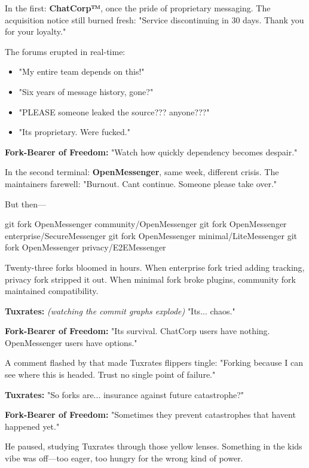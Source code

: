 In the first: \textbf{ChatCorp™}, once the pride of proprietary messaging. The acquisition notice still burned fresh: "Service discontinuing in 30 days. Thank you for your loyalty."

The forums erupted in real-time:

\begin{itemize}
\tightlist
\item
  "My entire team depends on this!"
\item
  "Six years of message history, gone?"
\item
  "PLEASE someone leaked the source??? anyone???"
\item
  "It\textquotesingle s proprietary. We\textquotesingle re fucked."
\end{itemize}

\textbf{Fork-Bearer of Freedom:} "Watch how quickly dependency becomes despair."

In the second terminal: \textbf{OpenMessenger}, same week, different crisis. The maintainer\textquotesingle s farewell: "Burnout. Can\textquotesingle t continue. Someone please take over."

But then---

\begin{codeblock}
git fork OpenMessenger community/OpenMessenger
git fork OpenMessenger enterprise/SecureMessenger  
git fork OpenMessenger minimal/LiteMessenger
git fork OpenMessenger privacy/E2EMessenger
\end{codeblock}

Twenty-three forks bloomed in hours. When enterprise fork tried adding tracking, privacy fork stripped it out. When minimal fork broke plugins, community fork maintained compatibility.

\textbf{Tuxrates:} \emph{(watching the commit graphs explode)} "It\textquotesingle s... chaos."

\textbf{Fork-Bearer of Freedom:} "It\textquotesingle s survival. ChatCorp users have nothing. OpenMessenger users have options."

A comment flashed by that made Tuxrates\textquotesingle{} flippers tingle: "Forking because I can see where this is headed. Trust no single point of failure."

\textbf{Tuxrates:} "So forks are... insurance against future catastrophe?"

\textbf{Fork-Bearer of Freedom:} "Sometimes they prevent catastrophes that haven\textquotesingle t happened yet."

He paused, studying Tuxrates through those yellow lenses. Something in the kid\textquotesingle s vibe was off---too eager, too hungry for the wrong kind of power.

